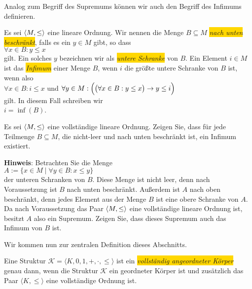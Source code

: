 \noindent
Analog zum Begriff des Supremums k\"onnen wir auch den Begriff des Infimums definieren.

\begin{Definition}[Infimum]
Es sei $\pair(M, \leq)$ eine lineare Ordnung.  Wir nennen die Menge $B \subseteq M$ \linebreak
\colorbox{gold}{\emph{nach unten beschr\"ankt}}, falls es ein
 $y \in M$ gibt, so dass 
\\[0.2cm]
\hspace*{1.3cm}
$\forall x \in B:  y \leq x$
\\[0.2cm]
gilt.  Ein solches $y$ bezeichnen wir als \colorbox{gold}{\emph{untere Schranke}}  von $B$.
Ein Element $i \in M$ ist das \colorbox{gold}{\emph{Infimum}} einer Menge $B$, wenn $i$ die gr\"o\ss{}te
untere Schranke von $B$ ist, wenn also 
\\[0.2cm]
\hspace*{1.3cm}
$\forall x \in B: i \leq x$ \quad \mbox{und} \quad
$\forall y \in M: \Bigl(\bigl(\forall x \in B: y \leq x \bigr)\rightarrow y \leq i \Bigr)$
\\[0.2cm]
gilt.  In diesem Fall schreiben wir
\\[0.2cm]
\hspace*{1.3cm}
$i = \inf(B)$.
\edx
\end{Definition}


\exercise
Es sei $\pair(M, \leq)$ eine vollst\"andige lineare Ordnung.  Zeigen Sie, dass f\"ur jede Teilmenge
$B \subseteq M$, die nicht-leer und nach unten beschr\"ankt ist, ein Infimum existiert.
\vspace*{0.2cm}

\noindent
\textbf{Hinweis}: Betrachten Sie die Menge
\\[0.2cm]
\hspace*{1.3cm}
$A := \{ x \in M \mid \forall y \in B: x \leq y \}$
\\[0.2cm]
der unteren Schranken von $B$.  Diese Menge ist nicht leer, denn nach Voraussetzung ist $B$ nach
unten beschr\"ankt.  Au\ss{}erdem ist $A$ nach oben beschr\"ankt, denn jedes Element aus der Menge $B$ ist
eine obere Schranke von $A$.  Da nach Voraussetzung das Paar $\pair(M, \leq)$ eine vollst\"andige
lineare Ordnung ist, besitzt $A$ also ein Supremum.  Zeigen Sie, dass dieses Supremum auch das
Infimum von $B$ ist. \eox

Wir kommen nun zur zentralen Definition dieses Abschnitts.
\begin{Definition} \hspace*{\fill} \linebreak
  Eine Struktur  $\mathcal{K} = \langle K, 0, 1, +, \cdot, \leq \rangle$  ist ein 
  \colorbox{gold}{\emph{vollst\"andig angeordneter K\"orper}} genau dann, wenn die Struktur $\mathcal{K}$
  ein geordneter K\"orper ist und zus\"atzlich das Paar $\langle K, \leq \rangle$ eine vollst\"andige
  Ordnung ist. \edx
\end{Definition}

